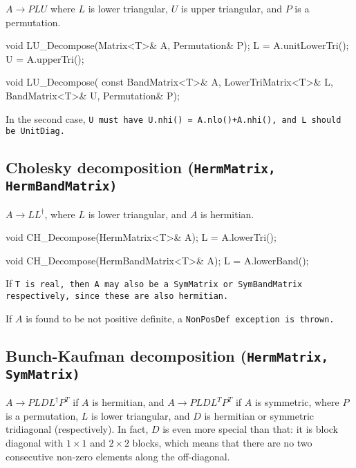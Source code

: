 $A \rightarrow P L U$ where $L$ is lower triangular, 
$U$ is upper triangular, and $P$ is a permutation.

\begin{tmvcode}
void LU_Decompose(Matrix<T>& A, Permutation& P);
L = A.unitLowerTri();
U = A.upperTri();

void LU_Decompose(
      const BandMatrix<T>& A, LowerTriMatrix<T>& L, BandMatrix<T>& U, 
      Permutation& P);
\end{tmvcode}
In the second case, \tt{U} must have \tt{U.nhi() = A.nlo()+A.nhi()},
and \tt{L} should be \tt{UnitDiag}.

\subsection[Cholesky decomposition] {Cholesky decomposition \rm (\tt{HermMatrix}, \tt{HermBandMatrix})}

$A \rightarrow L L^\dagger$, where $L$ is lower triangular,
and $A$ is hermitian.

\begin{tmvcode}
void CH_Decompose(HermMatrix<T>& A);
L = A.lowerTri();

void CH_Decompose(HermBandMatrix<T>& A);
L = A.lowerBand();
\end{tmvcode}
If \tt{T} is real, then \tt{A} may also be a \tt{SymMatrix} or \tt{SymBandMatrix} respectively, since these are also hermitian.

If $A$ is found to be not positive definite, a \tt{NonPosDef} exception is thrown.

\subsection[Bunch-Kaufman decomposition] {Bunch-Kaufman decomposition \rm (\tt{HermMatrix}, \tt{SymMatrix})}

$A \rightarrow P L D L^\dagger P^T$ if $A$ is hermitian,
and $A \rightarrow P L D L^T P^T$ if $A$ is symmetric, where $P$ is a permutation,
$L$ is lower triangular, and $D$ is hermitian or symmetric tridiagonal (respectively).  
In fact, $D$ is even more special than that: it is block diagonal with $1 \times 1$
and $2 \times 2$ blocks,
which means that there are no two consecutive
non-zero elements along the off-diagonal.

